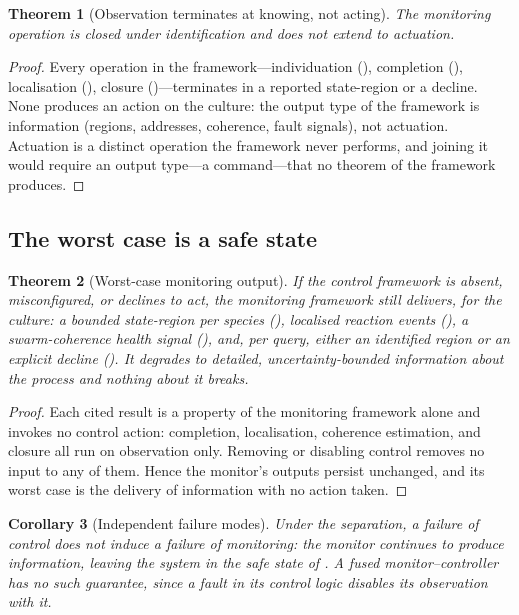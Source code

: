 \documentclass[11pt,twocolumn,a4paper]{article}
\theoremstyle{thmstyle}
\newtheorem{theorem}{Theorem}[section]
\newtheorem{corollary}[theorem]{Corollary}
\theoremstyle{definition}
\theoremstyle{remark}
\begin{document}
\begin{theorem}[Observation terminates at knowing, not acting]
\label{thm:sep-obs}
The monitoring operation is closed under identification and does not extend
to actuation.
\end{theorem}

\begin{proof}
Every operation in the framework---individuation (),
completion (), localisation (),
closure ()---terminates in a reported state-region or a
decline. None produces an action on the culture: the output type of the
framework is information (regions, addresses, coherence, fault signals),
not actuation. Actuation is a distinct operation the framework never
performs, and joining it would require an output type---a command---that no
theorem of the framework produces.
\end{proof}

\subsection{The worst case is a safe state}

\begin{theorem}[Worst-case monitoring output]
\label{thm:worst-case}
If the control framework is absent, misconfigured, or declines to act, the
monitoring framework still delivers, for the culture: a bounded state-region
per species (), localised reaction events
(), a swarm-coherence health signal
(), and, per query, either an identified region
or an explicit decline (). It degrades to detailed,
uncertainty-bounded information about the process and nothing about it
breaks.
\end{theorem}

\begin{proof}
Each cited result is a property of the monitoring framework alone and
invokes no control action: completion, localisation, coherence estimation,
and closure all run on observation only. Removing or disabling control
removes no input to any of them. Hence the monitor's outputs persist
unchanged, and its worst case is the delivery of information with no action
taken.
\end{proof}

\begin{corollary}[Independent failure modes]
\label{cor:independent-failure}
Under the separation, a failure of control does not induce a failure of
monitoring: the monitor continues to produce information, leaving the system
in the safe state of . A fused monitor--controller has
no such guarantee, since a fault in its control logic disables its
observation with it.
\end{corollary}
\end{document}
